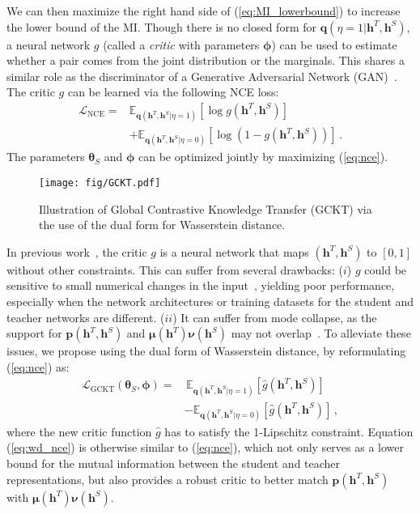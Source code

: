 \documentclass[final]{cvpr}
\newcommand{\hv}{{\boldsymbol h}}
\newcommand{\pv}{{\boldsymbol p}}
\newcommand{\qv}{{\boldsymbol q}}
\newcommand{\thetav}{{\boldsymbol \theta}}
\newcommand{\muv}{{\boldsymbol \mu}}
\newcommand{\nuv}{{\boldsymbol \nu}}
\newcommand{\phiv}{{\boldsymbol \phi}}
\newcommand{\Lcal}{\mathcal{L}}
\theoremstyle{definition}
\newcommand{\Ep}{{\mathbb E}}
\begin{document}
We can then maximize the right hand side of (\ref{eq:MI_lowerbound}) to increase the lower bound of the MI.
Though there is no closed form for $\qv(\eta=1 | \hv^T, \hv^S)$, a neural network $g$ (called a \emph{critic} with parameters $\phiv$) can be used to estimate whether a pair comes from the joint distribution or the marginals. 
This shares a similar role as the discriminator of a Generative Adversarial Network (GAN)~\cite{goodfellow2014generative}.
The critic $g$ can be learned via the following NCE loss:
\begin{align}
    \label{eq:nce}
    \Lcal_{\mathrm{NCE}} =&  \Ep_{\qv(\hv^T, \hv^S|\eta=1)}[\log g(\hv^T, \hv^S)] \nonumber\\
    &+ \Ep_{\qv(\hv^T, \hv^S|\eta=0)}[\log(1 - g(\hv^T, \hv^S))] \,.
\end{align}
The parameters $\thetav_S$ and $\phiv$ can be optimized jointly by maximizing (\ref{eq:nce}).

\begin{figure}[!t]
    \centering
    \texttt{[image: fig/GCKT.pdf]}
    \vspace{-5mm}
    \caption{\small\label{fig:wnce_framework} Illustration of Global Contrastive Knowledge Transfer (GCKT) via the use of the dual form for Wasserstein distance.}
    \vspace{-3mm}
\end{figure}

In previous work~\cite{tian2019contrastive}, the critic $g$ is a neural network that maps $(\hv^T, \hv^S)$ to $[0,1]$ without other constraints. This can suffer from several drawbacks: ($i$) $g$ could be sensitive to small numerical changes in the input~\cite{tian2019contrastive, ozair2019wasserstein}, yielding poor performance, especially when the network architectures or training datasets for the student and teacher networks are different. 
($ii$) It can suffer from mode collapse, as the support for $\pv(\hv^T,\hv^S)$ and $\muv(\hv^T) \nuv(\hv^S)$ may not overlap~\cite{wgan}. To alleviate these issues,
we propose using the dual form of Wasserstein distance, by reformulating
(\ref{eq:nce}) as: 
\begin{align}
\label{eq:wd_nce}
    \Lcal_{\mathrm{GCKT}}(\thetav_S,\phiv) =& \, \Ep_{\qv(\hv^T, \hv^S|\eta=1)}[ \hat{g}(\hv^T, \hv^S)] \nonumber \\
    &- \Ep_{\qv(\hv^T, \hv^S|\eta=0)}[ \hat{g}(\hv^T, \hv^S)]\,,
\end{align}
where the new critic function $\hat{g}$ has to satisfy the 1-Lipschitz constraint.
Equation (\ref{eq:wd_nce}) is otherwise similar to (\ref{eq:nce}), 
which not only serves as a lower bound for the mutual information between the student and teacher representations, but also provides a robust critic to better match $\pv(\hv^T,\hv^S)$ with $\muv(\hv^T)\nuv(\hv^S)$. 
\end{document}
